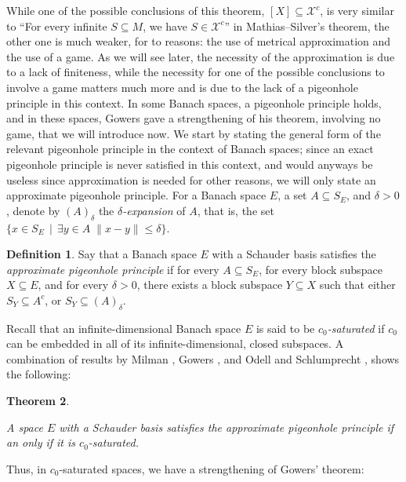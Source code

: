 \documentclass[a4paper,11pt]{article}
\newtheorem{thm}{Theorem}[section]
\theoremstyle{definition}
\newtheorem{defin}[thm]{Definition}
\numberwithin{equation}{section}
\newcommand{\X}{\mathcal{X}}
\begin{document}
While one of the possible conclusions of this theorem, $[X] \subseteq \X^c$, is very similar to ``For every infinite $S \subseteq M$, we have $S \in \X^c$'' in Mathias--Silver's theorem, the other one is much weaker, for to reasons: the use of metrical approximation and the use of a game. As we will see later, the necessity of the approximation is due to a lack of finiteness, while the necessity for one of the possible conclusions to involve a game matters much more and is due to the lack of a pigeonhole principle in this context. In some Banach spaces, a pigeonhole principle holds, and in these spaces, Gowers gave a strengthening of his theorem, involving no game, that we will introduce now. We start by stating the general form of the relevant pigeonhole principle in the context of Banach spaces; since an exact pigeonhole principle is never satisfied in this context, and would anyways be useless since approximation is needed for other reasons, we will only state an approximate pigeonhole principle. For a Banach space $E$, a set $A \subseteq S_E$, and $\delta > 0$, denote by $(A)_\delta$ the \textit{$\delta$-expansion} of $A$, that is, the set $\{x \in S_E \, \mid \, \exists y \in A \; \|x - y\| \leqslant \delta\}$.

\begin{defin}

Say that a Banach space $E$ with a Schauder basis satisfies the \emph{approximate pigeonhole principle} if for every $A \subseteq S_E$, for every block subspace $X \subseteq E$, and for every $\delta > 0$, there exists a block subspace $Y \subseteq X$ such that either $S_Y \subseteq A^c$, or $S_Y \subseteq (A)_\delta$.

\end{defin}

Recall that an infinite-dimensional Banach space $E$ is said to be \emph{$c_0$-saturated} if $c_0$ can be embedded in all of its infinite-dimensional, closed subspaces. A combination of results by Milman \cite{milman}, Gowers \cite{GowersLipschitz}, and Odell and Schlumprecht \cite{OdellSchlumprecht}, shows the following:

\begin{thm}\label{pigeonc0}

A space $E$ with a Schauder basis satisfies the approximate pigeonhole principle if an only if it is $c_0$-saturated.

\end{thm}

Thus, in $c_0$-saturated spaces, we have a strengthening of Gowers' theorem:
\end{document}
